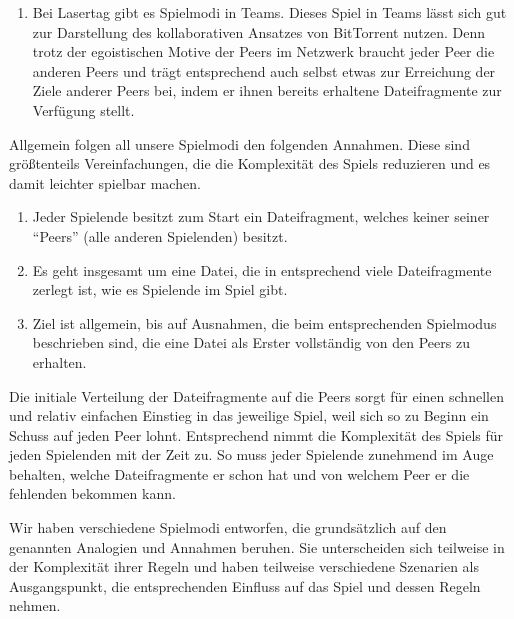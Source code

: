 \begin{enumerate}
\item Bei Lasertag gibt es Spielmodi in Teams. Dieses Spiel in Teams lässt sich gut zur Darstellung des kollaborativen Ansatzes von BitTorrent nutzen. Denn trotz der egoistischen Motive der Peers im Netzwerk braucht jeder Peer die anderen Peers und trägt entsprechend auch selbst etwas zur Erreichung der Ziele anderer Peers bei, indem er ihnen bereits erhaltene Dateifragmente zur Verfügung stellt.
\end{enumerate}

\noindent
Allgemein folgen all unsere Spielmodi den folgenden Annahmen. Diese sind größtenteils Vereinfachungen, die die Komplexität des Spiels reduzieren und es damit leichter spielbar machen.

\begin{enumerate}
\item Jeder Spielende besitzt zum Start ein Dateifragment, welches keiner seiner “Peers” (alle anderen Spielenden) besitzt.
\item Es geht insgesamt um eine Datei, die in entsprechend viele Dateifragmente zerlegt ist, wie es Spielende im Spiel gibt.
\item Ziel ist allgemein, bis auf Ausnahmen, die beim entsprechenden Spielmodus beschrieben sind, die eine Datei als Erster vollständig von den Peers zu erhalten.
\end{enumerate}

\noindent
Die initiale Verteilung der Dateifragmente auf die Peers sorgt für einen schnellen und relativ einfachen Einstieg in das jeweilige Spiel, weil sich so zu Beginn ein Schuss auf jeden Peer lohnt. Entsprechend nimmt die Komplexität des Spiels für jeden Spielenden mit der Zeit zu. So muss jeder Spielende zunehmend im Auge behalten, welche Dateifragmente er schon hat und von welchem Peer er die fehlenden bekommen kann.

Wir haben verschiedene Spielmodi entworfen, die grundsätzlich auf den genannten Analogien und Annahmen beruhen. Sie unterscheiden sich teilweise in der Komplexität ihrer Regeln und haben teilweise verschiedene Szenarien als Ausgangspunkt, die entsprechenden Einfluss auf das Spiel und dessen Regeln nehmen.